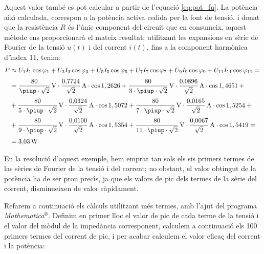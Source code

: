 \begin{exemple}
Aquest valor tamb\'{e} es pot calcular a partir de l'equaci\'{o}
\eqref{eq:pot_fu}. La pot\`{e}ncia aix\'{\i} calculada, correspon a la
pot\`{e}ncia activa cedida per la font de tensi\'{o}, i donat que la
resist\`{e}ncia $R$ \'{e}s l'\'{u}nic component del circuit que en consumeix,
aquest m\`{e}tode ens proporcionar\`{a} el mateix resultat; utilitzant les
expansions en s\`{e}rie de Fourier de la tensi\'{o} $u(t)$ i del corrent
$i(t)$, fins a la component harm\`{o}nica d'\'{\i}ndex 11, tenim:
\[\begin{split}
    P &\approx U_1 I_1 \cos\varphi_1 +  U_3 I_3 \cos\varphi_3 +
     U_5 I_5 \cos\varphi_5 + U_7 I_7 \cos\varphi_7 +
     U_9 I_9 \cos\varphi_9 + U_{11} I_{11} \cos\varphi_{11} = {}\\[0.7ex]
    &= \frac{80}{\piup\cdot\sqrt{2}}\unit{V} \cdot
    \frac{0{,}7724}{\sqrt{2}}\unit{A} \cdot \cos 1{,2626} +
    \frac{80}{3\cdot\piup\cdot\sqrt{2}}\unit{V} \cdot
    \frac{0{,}0896}{\sqrt{2}}\unit{A} \cdot \cos 1{,4651} + {} \\[0.7ex]
    &+ \frac{80}{5\cdot\piup\cdot\sqrt{2}}\unit{V} \cdot
    \frac{0{,}0324}{\sqrt{2}}\unit{A} \cdot \cos 1{,5072} +
    \frac{80}{7\cdot\piup\cdot\sqrt{2}}\unit{V} \cdot
    \frac{0{,}0165}{\sqrt{2}}\unit{A} \cdot \cos 1{,5254} + {}\\[0.7ex]
    &+ \frac{80}{9\cdot\piup\cdot\sqrt{2}}\unit{V} \cdot
    \frac{0{,}0100}{\sqrt{2}}\unit{A} \cdot \cos 1{,5354} +
    \frac{80}{11\cdot\piup\cdot\sqrt{2}}\unit{V} \cdot
    \frac{0{,}0067}{\sqrt{2}}\unit{A} \cdot \cos 1{,5419}= {}\\[0.7ex]
    &=3{,}03\unit{W}
\end{split}\]

En la resoluci\'{o} d'aquest exemple, hem emprat tan sols els sis
primers termes de las s\`{e}ries de Fourier de la tensi\'{o} i del corrent;
no obstant, el valor  obtingut de la pot\`{e}ncia ha de ser prou prec\'{\i}s, ja que
els valors de pic dels termes de la s\`{e}rie del corrent, disminueixen de
valor r\`{a}pidament.

Refarem a continuaci\'{o} els c\`{a}lculs utilitzant m\'{e}s termes, amb l'ajut
del programa
\textit{Mathematica}${}^\circledR$.
Definim en primer lloc el valor de pic de cada
 terme de la tensi\'{o} i el valor del m\`{o}dul de la imped\`{a}ncia corresponent,
calculem a continuaci\'{o} els 100 primers termes del corrent de pic, i
per acabar calculem el valor efica\c{c} del corrent i la pot\`{e}ncia:


\end{exemple}
